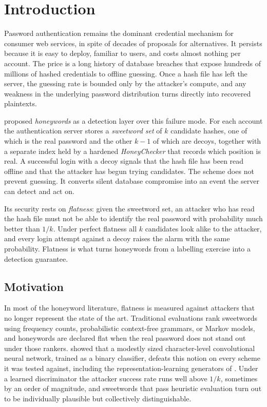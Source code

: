 \chapter{Introduction}
\label{ch:introduction}

Password authentication remains the dominant credential mechanism for
consumer web services, in spite of decades of proposals for
alternatives. It persists because it is easy to deploy, familiar to
users, and costs almost nothing per account. The price is a long history
of database breaches that expose hundreds of millions of hashed
credentials to offline guessing. Once a hash file has left the server,
the guessing rate is bounded only by the attacker's compute, and any
weakness in the underlying password distribution turns directly into
recovered plaintexts.

\textcite{juels2013honeywords} proposed \emph{honeywords} as a detection
layer over this failure mode. For each account the authentication server
stores a \emph{sweetword set} of $k$ candidate hashes, one of which is
the real password and the other $k-1$ of which are decoys, together with
a separate index held by a hardened \emph{HoneyChecker} that records
which position is real. A successful login with a decoy signals that the
hash file has been read offline and that the attacker has begun trying
candidates. The scheme does not prevent guessing. It converts silent
database compromise into an event the server can detect and act on.

Its security rests on \emph{flatness}: given the sweetword set, an
attacker who has read the hash file must not be able to identify the
real password with probability much better than $1/k$. Under perfect
flatness all $k$ candidates look alike to the attacker, and every login
attempt against a decoy raises the alarm with the same probability.
Flatness is what turns honeywords from a labelling exercise into a
detection guarantee.

\section{Motivation}

In most of the honeyword literature, flatness is measured against
attackers that no longer represent the state of the art. Traditional
evaluations rank sweetwords using frequency counts, probabilistic
context-free grammars, or Markov models, and honeywords are declared
flat when the real password does not stand out under those rankers.
\textcite{dani2024passfilter} showed that a modestly sized
character-level convolutional neural network, trained as a binary
classifier, defeats this notion on every scheme it was tested against,
including the representation-learning generators of
\textcite{dionysiou2021honeygen}. Under a learned discriminator the
attacker success rate runs well above $1/k$, sometimes by an order of
magnitude, and sweetwords that pass heuristic evaluation turn out to be
individually plausible but collectively distinguishable.

